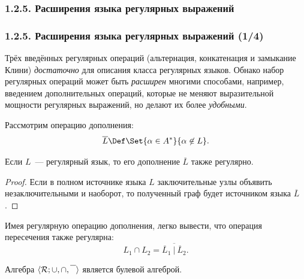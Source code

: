 \subsubsection{1.2.5. Расширения языка регулярных выражений}
\label{1.2.5.}

\begin{frame}
\frametitle{1.2.5. Расширения языка регулярных выражений (1/4)}

Трёх введённых регулярных операций
(альтернация, конкатенация и замыкание Клини) {\em достаточно} 
для описания класса регулярных языков.
Обнако набор регулярных операций может быть {\em расширен} многими способами,
например, введением дополнительных операций, которые не меняют
выразительной мощности регулярных выражений, но делают их более
{\em удобными}.

\smallskip
Рассмотрим операцию дополнения:
$$\overline{L}\Def
\Set{\alpha\in A^*}{\alpha\not\in L}.$$

\begin{theorem}
Если $L$~--- регулярный язык, то
его дополнение $\overline{L}$ также регулярно.
\end{theorem}
\begin{proof}
Если в полном
источнике языка $L$ заключительные узлы
объявить незаключительными и наоборот, то полученный граф будет
источником языка $\overline{L}$.
\end{proof}

\smallskip
Имея регулярную операцию дополнения, легко
вывести, что операция пересечения также регулярна:
$$
L_1\cap L_2 =
\overline{\overline{L}_1~|~\overline{L}_2}.
$$

\begin{remark}
Алгебра $\langle \cal{R}; \cup, \cap, \overline{\phantom{L}}\rangle$ является булевой алгеброй. 
\end{remark}

\end{frame}


